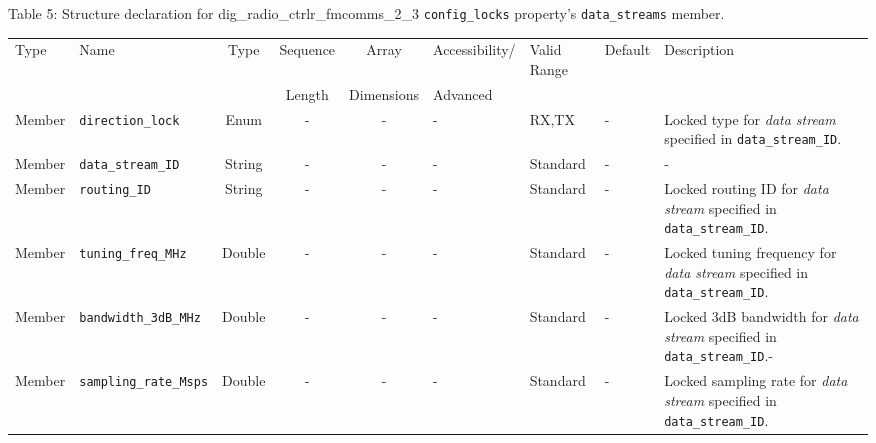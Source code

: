 \documentclass{article}
\def\comp{dig\_radio\_ctrlr\_fmcomms\_2\_3}
\begin{document}
\begin{landscape}
	\noindent Table \hypertarget{tab5}{5}: Structure declaration for \comp{} \verb+config_locks+ property's \verb+data_streams+ member. \\
	\begin{scriptsize}
		\noindent\begin{longtable}{|p{1.8cm}|p{3.6cm}|c|c|c|p{2cm}|p{1.7cm}|p{1.0cm}|p{7.38cm}|}
			\hline
			\rowcolor{blue}
			Type         & Name                                & Type & Sequence & Array      & Accessibility/ & Valid Range  & Default & Description                                                                                                                                                                                                                 \\
			\rowcolor{blue}
			             &                                     &      & Length   & Dimensions & Advanced       &              &         &                                                                                                                                                                                                                             \\
			\hline
			Member       & \verb+direction_lock+               & Enum  & -       & -          & -              & RX,TX        & -       & Locked type for \textit{data stream} specified in \verb+data_stream_ID+. \\
			\hline
			Member       & \verb+data_stream_ID+               & String& -       & -          & -              & Standard     & -       & - \\
			\hline
			Member       & \verb+routing_ID+                   & String& -       & -          & -              & Standard     & -       & Locked routing ID for \textit{data stream} specified in \verb+data_stream_ID+. \\
			\hline
			Member       & \verb+tuning_freq_MHz+              & Double & -       & -          & -              & Standard     & -       & Locked tuning frequency for \textit{data stream} specified in \verb+data_stream_ID+. \\
			\hline
			Member       & \verb+bandwidth_3dB_MHz+              & Double & -       & -          & -              & Standard     & -       & Locked 3dB bandwidth for \textit{data stream} specified in \verb+data_stream_ID+.- \\
			\hline
			Member       & \verb+sampling_rate_Msps+             & Double & -       & -          & -              & Standard     & -       & Locked sampling rate for \textit{data stream} specified in \verb+data_stream_ID+. \\

\end{longtable}
\end{scriptsize}
\end{landscape}
\end{document}
